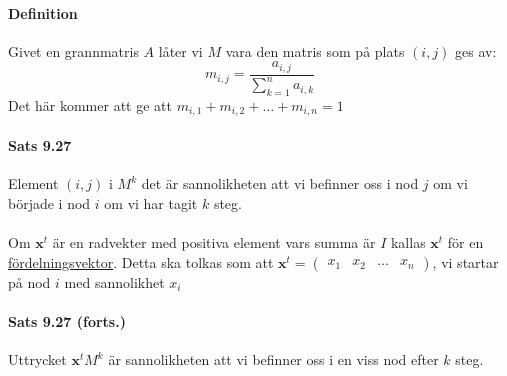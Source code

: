 \paragraph{Definition} Givet en grannmatris $A$ låter vi $M$ vara den matris som på plats $(i,j)$ ges av:
\begin{equation*}
    m_{i,j}=\frac{a_{i,j}}{\sum^n_{k=1}a_{i,k}}
\end{equation*}
Det här kommer att ge att $m_{i,1}+m_{i,2}+\ldots+m_{i,n}=1$

\paragraph{Sats 9.27} Element $(i,j)$ i $M^k$ det är sannolikheten att vi befinner oss i nod $j$ om vi började i nod $i$ om vi har tagit $k$ steg.
\\\\
Om $\bm{x}^t$ är en radvekter med positiva element vars summa är $I$ kallas $\bm{x}^t$ för en \underline{fördelningsvektor}.
Detta ska tolkas som att $\bm{x}^t=\begin{pmatrix}
    x_1&x_2&\ldots&x_n
\end{pmatrix}$, vi startar på nod $i$ med sannolikhet $x_i$

\paragraph{Sats 9.27 (forts.)} Uttrycket $\bm{x}^tM^k$ är sannolikheten att vi befinner oss i en viss nod efter $k$ steg.
